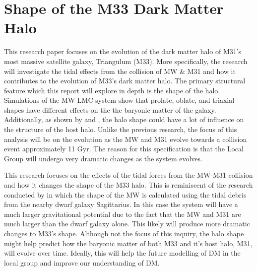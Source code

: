 \documentclass[usenatbib]{mnras}
\begin{document}
\section{Shape of the M33 Dark Matter Halo}
This research paper focuses on the evolution of the dark matter halo of M31's most massive satellite galaxy, Triangulum (M33). More specifically, the research will investigate the tidal effects from the collision of MW \& M31 and how it contributes to the evolution of M33's dark matter halo. The primary structural feature which this report will explore in depth is the shape of the halo. Simulations of the MW-LMC system show that prolate, oblate, and triaxial shapes have different effects on the the baryonic matter of the galaxy. Additionally, as shown by \cite{Law10} and \cite{Debattista_2013}, the halo shape could have a lot of influence on the structure of the host halo. Unlike the previous research, the focus of this analysis will be on the evolution as the MW and M31 evolve towards a collision event approximately 11 Gyr. The reason for this specification is that the Local Group will undergo very dramatic changes as the system evolves.     


This research focuses on the effects of the tidal forces from the MW-M31 collision and how it changes the shape of the M33 halo. This is reminiscent of the research conducted by \cite{Law10} in which the shape of the MW is calculated using the tidal debris from the nearby dwarf galaxy Sagittarius. In this case the system will have a much larger gravitational potential due to the fact that the MW and M31 are much larger than the dwarf galaxy alone. This likely will produce more dramatic changes to M33's shape. Although not the focus of this inquiry, the halo shape might help predict how the baryonic matter of both M33 and it's host halo, M31, will evolve over time. Ideally, this will help the future modelling of DM in the local group and improve our understanding of DM. 
\end{document}
